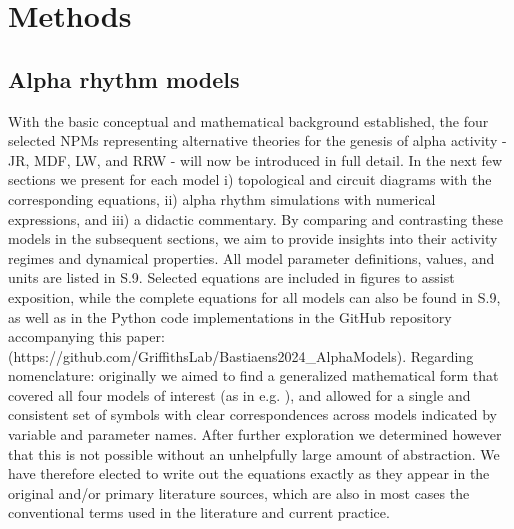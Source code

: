 \documentclass[12pt,twoside]{article}
\begin{document}
\section{Methods}


\subsection{Alpha rhythm models} 
With the basic conceptual and mathematical background established, the four selected NPMs representing alternative theories for the genesis of alpha activity - JR, MDF, LW, and RRW - will now be introduced in full detail. In the next few sections we present for each model i) topological and circuit diagrams with the corresponding equations, ii) alpha rhythm simulations with numerical expressions, and iii) a didactic commentary. By comparing and contrasting these models in the subsequent sections, we aim to provide insights into their activity regimes and dynamical properties. All model parameter definitions, values, and units are listed in S.9. Selected equations are included in figures to assist exposition, while the complete equations for all models can also be found in S.9, as well as in the Python code implementations in the GitHub repository accompanying this paper:\\(https://github.com/GriffithsLab/Bastiaens2024\_AlphaModels). Regarding nomenclature: originally we aimed to find a generalized mathematical form that covered all four models of interest (as in e.g. \citealp{sanz2015mathematical}), and allowed for a single and consistent set of symbols with clear correspondences across models indicated by variable and parameter names. After further exploration we determined however that this is not possible without an unhelpfully large amount of abstraction. We have therefore elected to write out the equations exactly as they appear in the original and/or primary literature sources, which are also in most cases the conventional terms used in the literature and current practice. 




\end{document}
